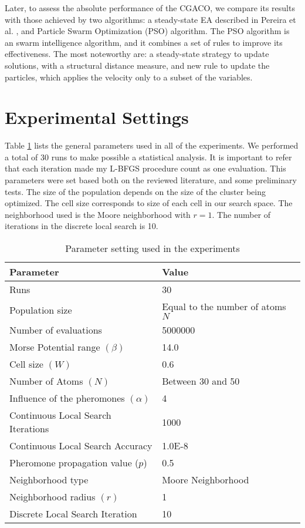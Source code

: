 	Later, to assess the absolute performance of the CGACO, we compare its results with those achieved by two algorithms: a steady-state EA described in Pereira et al. \cite{xico09}, and Particle Swarm Optimization (PSO) algorithm. The PSO algorithm is an swarm intelligence algorithm, and it combines a set of rules to improve its effectiveness. The most noteworthy are: a steady-state strategy to update solutions, with a structural distance measure, and new rule to update the particles, which applies the velocity only to a subset of the variables.
	
\section{Experimental Settings}
\label{sec:experimental_setting}

Table \ref{tab:general_settings} lists the general parameters used in all of the experiments. We performed a total of 30 runs to make possible a statistical analysis. It is important to refer that each iteration made my L-BFGS procedure count as one evaluation. This parameters were set based both on the reviewed literature, and some preliminary tests. The size of the population depends on the size of the cluster being optimized. 
The cell size corresponds to size of each cell in our search space. The neighborhood used is the Moore neighborhood with $r = 1$. The number of iterations in the discrete local search is 10.

\begin{table}[!htbp]
	\begin{center}
		\begin{tabular}{| l | p{8cm} |}
			\hline
			\textbf{Parameter} & \textbf{Value} \\ \hline
			Runs & 30 \\
			Population size & Equal to the number of atoms $N$\\
			Number of evaluations & 5000000 \\
			Morse Potential range $(\beta)$ & 14.0 \\ 
			Cell size $(W)$ & 0.6 \\
			Number of Atoms $(N)$ & Between 30 and 50 \\
			Influence of the pheromones $(\alpha)$ & 4 \\
			Continuous Local Search Iterations & 1000\\
			Continuous Local Search Accuracy & 1.0E-8\\
			Pheromone propagation value ($p$) & 0.5 \\
			Neighborhood type & Moore Neighborhood \\
			Neighborhood radius $(r)$ & 1 \\
			Discrete Local Search Iteration & 10 \\
			\hline
		\end{tabular}
	\caption{Parameter setting used in the experiments}
	\label{tab:general_settings}
	\end{center}
\end{table}

